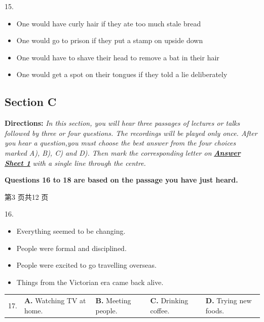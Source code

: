 \documentclass[UTF8,11pt]{ctexart}
\begin{document}
15.


\begin{itemize}[leftmargin=2em,itemsep=.2em,topsep=.4em]\item[A.] One would have curly hair if they ate too much stale bread
\item[B.] One would go to prison if they put a stamp on upside down
\item[C.] One would have to shave their head to remove a bat in their hair
\item[D.] One would get a spot on their tongues if they told a lie deliberately
\end{itemize}

\subsection*{\textbf{Section C}}


\textbf{Directions:}\textit{ In this section, you will hear three passages of lectures or talks followed by three or four} \textit{questions. The recordings will be played only once. After you hear a question,you must choose the best} \textit{answer from the four choices marked A), B), C) and D). Then mark the corresponding letter on}\textbf{\textit{ }}\textbf{\textit{\uline{Answer}}} \textbf{\textit{\uline{Sheet 1}}}\textit{ with a single line through the centre.}


\textbf{Questions 16 to 18 are based on the passage you have just heard.}


第3 页共12 页


16.


\begin{itemize}[leftmargin=2em,itemsep=.2em,topsep=.4em]\item[A.] Everything seemed to be changing.
\item[B.] People were formal and disciplined.
\item[C.] People were excited to go travelling overseas.
\item[D.] Things from the Victorian era came back alive.
\end{itemize}

\noindent\begin{tabularx}{\linewidth}{@{}lXXXX@{}}17. & \textbf{A.} Watching TV at home. & \textbf{B.} Meeting people. & \textbf{C.} Drinking coffee. & \textbf{D.} Trying new foods.\\\end{tabularx}\par
\end{document}
